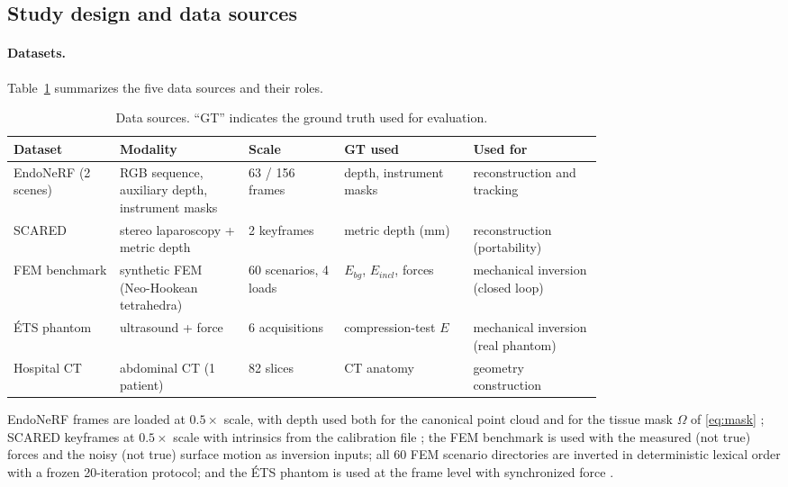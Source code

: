 \documentclass[pdflatex,lineno,referee,sn-vancouver,Numbered]{sn-jnl}
\begin{document}
\subsection{Study design and data sources}
\label{sec:setup}

\paragraph{Datasets.}
Table~\ref{tab:datasets} summarizes the five data sources and their roles.

\begin{table}[htbp]
\centering
\caption{Data sources. ``GT'' indicates the ground truth used for evaluation.}
\label{tab:datasets}
\scriptsize
\begin{tabular}{@{}p{0.14\linewidth}p{0.17\linewidth}p{0.11\linewidth}p{0.17\linewidth}p{0.17\linewidth}@{}}
\toprule
Dataset & Modality & Scale & GT used & Used for \\
\midrule
EndoNeRF (2 scenes) & RGB sequence, auxiliary depth, instrument masks & 63 / 156 frames & depth, instrument masks & reconstruction and tracking \\
SCARED & stereo laparoscopy + metric depth & 2 keyframes & metric depth (mm) & reconstruction (portability) \\
FEM benchmark & synthetic FEM (Neo-Hookean tetrahedra) & 60 scenarios, 4 loads & $E_{bg}$, $E_{incl}$, forces & mechanical inversion (closed loop) \\
\'ETS phantom & ultrasound + force & 6 acquisitions & compression-test $E$ & mechanical inversion (real phantom) \\
Hospital CT & abdominal CT (1 patient) & 82 slices & CT anatomy & geometry construction \\
\bottomrule
\end{tabular}
\end{table}

EndoNeRF frames are loaded at $0.5\times$ scale, with depth used both for
the canonical point cloud and for the tissue mask $\Omega$ of
\eqref{eq:mask} \cite{endonerf}; SCARED keyframes at $0.5\times$ scale with intrinsics from
the calibration file \cite{scared}; the FEM benchmark is used with the measured (not
true) forces and the noisy (not true) surface motion as inversion inputs;
all 60 FEM scenario directories are inverted in deterministic lexical
order with a frozen 20-iteration protocol; and the \'ETS phantom is used at the frame level with
synchronized force \cite{etsphantom}.
\end{document}
